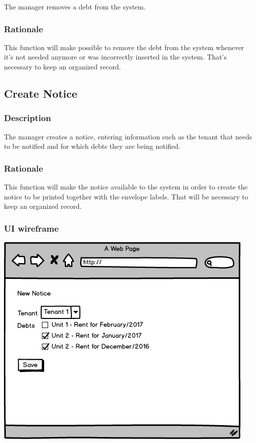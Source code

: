 \documentclass{scrreprt}
\begin{document}
The manager removes a debt from the system.

\subsubsection{Rationale}

This function will make possible to remove the debt from the system whenever it's not needed anymore or was incorrectly inserted in the system. That's necessary to keep an organized record.

\subsection{Create Notice}
\subsubsection{Description}

The manager creates a notice, entering information such as the tenant that needs to be notified and for which debts they are being notified.

\subsubsection{Rationale}

This function will make the notice available to the system in order to create the notice to be printed together with the envelope labels. That will be necessary to keep an organized record.

\subsubsection{UI wireframe}
\includegraphics[scale=0.60]{mockups/createnotice.png}
\end{document}

